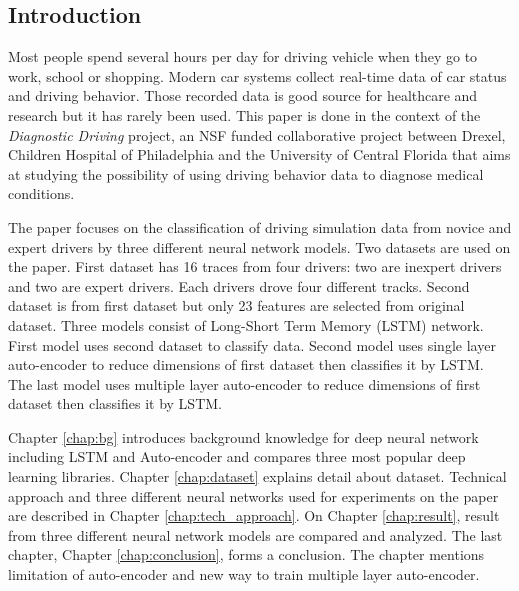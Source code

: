 \documentclass[draft,dvipsnames]{drexel-thesis}
\begin{document}
\begin{thesis}



\chapter{Introduction}\label{chap:intro}
Most people spend several hours per day for driving vehicle when they go to work, school or shopping. Modern car systems collect real-time data of car status and driving behavior. Those recorded data is good source for healthcare and research but it has rarely been used. This paper is done in the context of the {\em Diagnostic Driving} project, an NSF funded collaborative project between Drexel, Children Hospital of Philadelphia and the University of Central Florida that aims at studying the possibility of using driving behavior data to diagnose medical conditions.

The paper focuses on the classification of driving simulation data from novice and expert drivers by three different neural network models. Two datasets are used on the paper. First dataset has 16 traces from four drivers: two are inexpert drivers and two are expert drivers. Each drivers drove four different tracks. Second dataset is from first dataset but only 23 features are selected from original dataset. Three models consist of Long-Short Term Memory (LSTM) network. First model uses second dataset to classify data. Second model uses single layer auto-encoder to reduce dimensions of first dataset then classifies it by LSTM. The last model uses multiple layer auto-encoder to reduce dimensions of first dataset then classifies it by LSTM.

Chapter \ref{chap:bg} introduces background knowledge for deep neural network including LSTM and Auto-encoder and compares three most popular deep learning libraries. Chapter \ref{chap:dataset} explains detail about dataset. Technical approach and three different neural networks used for experiments on the paper are described in Chapter \ref{chap:tech_approach}. On Chapter \ref{chap:result}, result from three different neural network models are compared and analyzed. The last chapter, Chapter \ref{chap:conclusion}, forms a conclusion. The chapter mentions limitation of auto-encoder and new way to train multiple layer auto-encoder.



\end{thesis}
\end{document}
